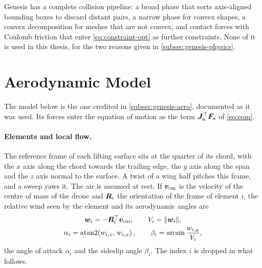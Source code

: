 Genesis has a complete collision pipeline: a broad phase that sorts axis-aligned bounding boxes to discard distant pairs, a narrow phase for convex shapes, a convex decomposition for meshes that are not convex, and contact forces with Coulomb friction that enter \eqref{eq:constraint-opt} as further constraints. None of it is used in this thesis, for the two reasons given in \autoref{subsec:genesis-physics}.

\section{Aerodynamic Model}
\label{app:aero}

The model below is the one credited in \autoref{subsec:genesis-aero}, documented as it was used. Its forces enter the equation of motion as the term $\bm{J}_{\mathrm{a}}^{\top} \bm{F}_{\mathrm{a}}$ of \eqref{eq:eom}.

\paragraph{Elements and local flow.} The reference frame of each lifting surface sits at the quarter of its chord, with the $x$ axis along the chord towards the trailing edge, the $y$ axis along the span and the $z$ axis normal to the surface. A twist of a wing half pitches this frame, and a sweep yaws it. The air is assumed at rest. If $\bm{v}_{\mathrm{cm}}$ is the velocity of the centre of mass of the drone and $\bm{R}_i$ the orientation of the frame of element $i$, the relative wind seen by the element and its aerodynamic angles are
\begin{equation}
\begin{gathered}
\bm{w}_i = -\bm{R}_i^{\top} \bm{v}_{\mathrm{cm}}, \qquad V_i = \lVert \bm{w}_i \rVert, \\
\alpha_i = \operatorname{atan2}\!\left(w_{i,z},\, w_{i,x}\right), \qquad \beta_i = \arcsin\frac{w_{i,y}}{V_i},
\end{gathered}
\label{eq:aero-angles}
\end{equation}
the angle of attack $\alpha_i$ and the sideslip angle $\beta_i$. The index $i$ is dropped in what follows.

